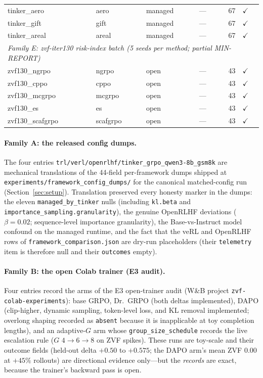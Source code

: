\documentclass{article}
\providecommand{\secref}[1]{Section~\ref{#1}}
\begin{document}
\begin{table}[t]
\begin{tabular}{llllrl}
tinker_aero & aero & managed & --- & 67 & $\checkmark$ \\
tinker_gift & gift & managed & --- & 67 & $\checkmark$ \\
tinker_areal & areal & managed & --- & 67 & $\checkmark$ \\
\midrule
\multicolumn{6}{l}{\emph{Family E: zvf-iter130 risk-index batch (5 seeds per method; partial MIN-REPORT)}}\\
zvf130_ngrpo & ngrpo & open & --- & 43 & $\checkmark$ \\
zvf130_cppo & cppo & open & --- & 43 & $\checkmark$ \\
zvf130_mcgrpo & mcgrpo & open & --- & 43 & $\checkmark$ \\
zvf130_es & es & open & --- & 43 & $\checkmark$ \\
zvf130_scafgrpo & scafgrpo & open & --- & 43 & $\checkmark$ \\
\bottomrule
\end{tabular}
\end{table}

\paragraph{Family A: the released config dumps.}
The four entries \texttt{trl/verl/openrlhf/tinker_grpo_qwen3-8b_gsm8k} are
mechanical translations of the 44-field per-framework dumps shipped at
\texttt{experiments/framework_config_dumps/} for the canonical matched-config
run (\secref{sec:setup}). Translation preserved every honesty marker in the
dumps: the eleven \texttt{managed_by_tinker} nulls (including \texttt{kl.beta}
and \texttt{importance_sampling.granularity}), the genuine OpenRLHF deviations
($\beta{=}0.02$; sequence-level importance granularity), the Base-vs-Instruct
model confound on the managed runtime, and the fact that the veRL and OpenRLHF
rows of \texttt{framework_comparison.json} are dry-run placeholders (their
\texttt{telemetry} item is therefore null and their \texttt{outcomes} empty).

\paragraph{Family B: the open Colab trainer (E3 audit).}
Four entries record the arms of the E3 open-trainer audit (W\&B project
\texttt{zvf-colab-experiments}): base GRPO, Dr.~GRPO (both deltas
implemented), DAPO (clip-higher, dynamic sampling, token-level loss, and KL
removal implemented; overlong shaping recorded as \texttt{absent} because it
is inapplicable at toy completion lengths), and an adaptive-$G$ arm whose
\texttt{group_size_schedule} records the live escalation rule ($G$
$4{\to}6{\to}8$ on ZVF spikes). These runs are toy-scale and their outcome
fields (held-out delta $+0.50$ to $+0.575$; the DAPO arm's mean ZVF $0.00$ at
$+45\%$ rollouts) are directional evidence only---but the \emph{records} are
exact, because the trainer's backward pass is open.
\end{document}
